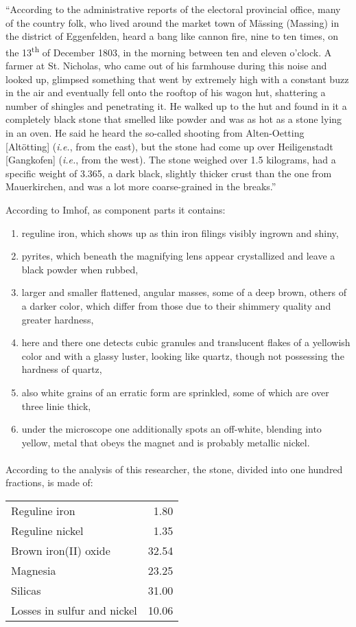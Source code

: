\documentclass[a4paper, 12pt, oneside]{article}
\begin{document}
``According to the administrative reports of the electoral provincial office, many of the country folk, who lived around the market town of Mässing (Massing) in the district of Eggenfelden, heard a bang like cannon fire, nine to ten times, on the 13\textsuperscript{th} of December 1803, in the morning between ten and eleven o'clock. A farmer at St. Nicholas, who came out of his farmhouse during this noise and looked up, glimpsed something that went by extremely high with a constant buzz in the air and eventually fell onto the rooftop of his wagon hut, shattering a number of shingles and penetrating it. He walked up to the hut and found in it a completely black stone that smelled like powder and was as hot as a stone lying in an oven. He said he heard the so-called shooting from Alten-Oetting [Altötting] (\emph{i.e.}, from the east), but the stone had come up over Heiligenstadt [Gangkofen] (\emph{i.e.}, from the west). The stone weighed over 1.5 kilograms, had a specific weight of 3.365, a dark black, slightly thicker crust than the one from Mauerkirchen, and was a lot more coarse-grained in the breaks.''

According to Imhof, as component parts it contains:
\begin{enumerate}
    \item reguline iron, which shows up as thin iron filings visibly ingrown and shiny,
    \item pyrites, which beneath the magnifying lens appear crystallized and leave a black powder when rubbed,
    \item larger and smaller flattened, angular masses, some of a deep brown, others of a darker color, which differ from those due to their shimmery quality and greater hardness,
    \item here and there one detects cubic granules and translucent flakes of a yellowish color and with a glassy luster, looking like quartz, though not possessing the hardness of quartz,
    \item also white grains of an erratic form are sprinkled, some of which are over three linie thick,
    \item under the microscope one additionally spots an off-white, blending into yellow, metal that obeys the magnet and is probably metallic nickel.
\end{enumerate}
\paragraph{}
According to the analysis of this researcher, the stone, divided into one hundred fractions, is made of:
\begin{center}
    \begin{tabular}{l r}
        Reguline iron & 1.80\\
        Reguline nickel & 1.35\\
        Brown iron(II) oxide & 32.54\\
        Magnesia & 23.25\\
        Silicas & 31.00\\
        Losses in sulfur and nickel & 10.06\\
    \end{tabular}
\end{center}
\end{document}
